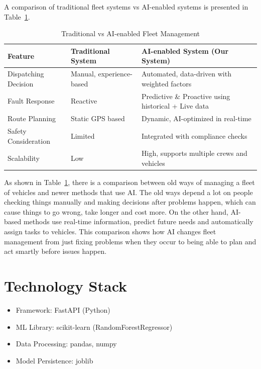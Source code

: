 A comparison of traditional fleet systems vs AI-enabled systems is presented in Table~\ref{tab:6.1}.

\begin{table}[H]
    \centering
    \caption{Traditional vs AI-enabled Fleet Management}
    \label{tab:6.1}
    \vspace{0.3cm} %
    \begin{tabular}{>{\raggedright\arraybackslash}p{4cm}>{\raggedright\arraybackslash}p{5cm}>{\raggedright\arraybackslash}p{5cm}}
        \toprule
        \textbf{Feature} & \textbf{Traditional System} & \textbf{AI-enabled System (Our System)} \\
        \midrule
        Dispatching Decision & Manual, experience-based & Automated, data-driven with weighted factors \\
        Fault Response & Reactive & Predictive \& Proactive using historical + Live data \\
        Route Planning & Static GPS based & Dynamic, AI-optimized in real-time \\
        Safety Consideration & Limited & Integrated with compliance checks \\
        Scalability & Low & High, supports multiple crews and vehicles \\
        \bottomrule
    \end{tabular}
\end{table}

As shown in Table~\ref{tab:6.1}, there is a comparison between old ways of managing a fleet of vehicles and newer methods that use AI. The old ways depend a lot on people checking things manually and making decisions after problems happen, which can cause things to go wrong, take longer and cost more. On the other hand, AI-based methods use real-time information, predict future needs and automatically assign tasks to vehicles. This comparison shows how AI changes fleet management from just fixing problems when they occur to being able to plan and act smartly before issues happen.

\section{Technology Stack}
\begin{itemize}
    \item Framework: FastAPI (Python)
    \item ML Library: scikit-learn (RandomForestRegressor)
    \item Data Processing: pandas, numpy
    \item Model Persistence: joblib
\end{itemize}

